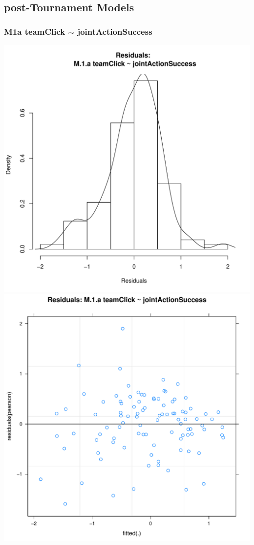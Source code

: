 \documentclass[12pt]{report}
\begin{document}
\newpage
\subsection{post-Tournament Models}

\subsubsection{M1a teamClick $\sim$ jointActionSuccess}


\newpage
\centering
\includegraphics[scale =.4]{../images/MLM1aHist.pdf}
\includegraphics[scale =.4]{../images/MLM1aScatter.pdf}
\end{document}
